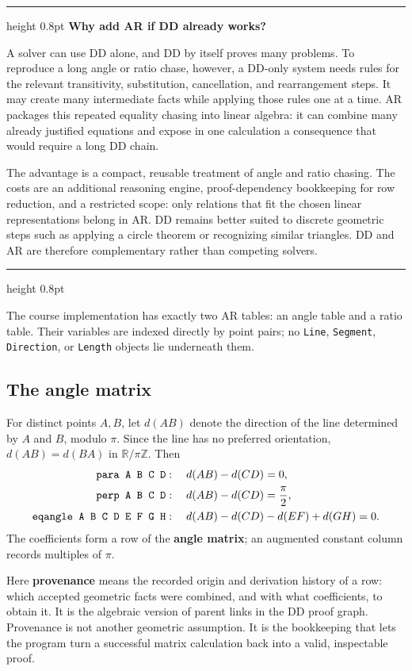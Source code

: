 \documentclass[reqno]{amsart}
\newenvironment{lecturebox}[1]{%
    \par\medskip
    \noindent\begingroup
    \setlength{\parindent}{0pt}
    \color{agblue}\hrule height 0.8pt\color{black}
    \smallskip
    \textbf{\color{agblue}#1}\par\smallskip
}{%
    \smallskip
    \color{agblue}\hrule height 0.8pt\color{black}
    \endgroup
    \medskip
}
\newcommand{\keyterm}[1]{\textbf{\color{agblue}#1}}
\DeclareMathOperator{\1}{\textbf{1}}
\begin{document}
\begin{lecturebox}{Why add AR if DD already works?}
A solver can use DD alone, and DD by itself proves many problems. To reproduce
a long angle or ratio chase, however, a DD-only system needs rules for the
relevant transitivity, substitution, cancellation, and rearrangement steps.
It may create many intermediate facts while applying those rules one at a
time. AR packages this repeated equality chasing into linear algebra: it can
combine many already justified equations and expose in one calculation a
consequence that would require a long DD chain.

The advantage is a compact, reusable treatment of angle and ratio chasing.
The costs are an additional reasoning engine, proof-dependency bookkeeping for
row reduction, and a restricted scope: only relations that fit the chosen
linear representations belong in AR. DD remains better suited to discrete
geometric steps such as applying a circle theorem or recognizing similar
triangles. DD and AR are therefore complementary rather than competing
solvers.
\end{lecturebox}

The course implementation has exactly two AR tables: an angle table and a
ratio table.  Their variables are indexed directly by point pairs; no
\texttt{Line}, \texttt{Segment}, \texttt{Direction}, or \texttt{Length}
objects lie underneath them.

\subsection*{The angle matrix}

For distinct points $A,B$, let $d(AB)$ denote the direction of the line
determined by $A$ and $B$, modulo $\pi$. Since the line has no preferred
orientation, $d(AB)=d(BA)$ in $\mathbb R/\pi\mathbb Z$. Then
\[
\begin{aligned}
\verb|para A B C D|&:\quad d(AB)-d(CD)=0,\\
\verb|perp A B C D|&:\quad d(AB)-d(CD)=\frac{\pi}{2},\\
\verb|eqangle A B C D E F G H|&:\quad
d(AB)-d(CD)-d(EF)+d(GH)=0.
\end{aligned}
\]
The coefficients form a row of the \keyterm{angle matrix}; an augmented
constant column records multiples of $\pi$.

Here \keyterm{provenance} means the recorded origin and derivation history of
a row: which accepted geometric facts were combined, and with what
coefficients, to obtain it. It is the algebraic version of parent links in the
DD proof graph. Provenance is not another geometric assumption. It is the
bookkeeping that lets the program turn a successful matrix calculation back
into a valid, inspectable proof.
\end{document}
